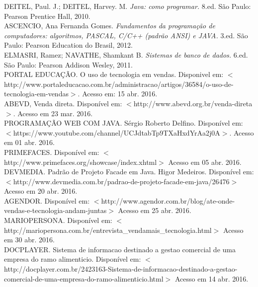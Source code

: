 \documentclass[chapter=TITLE,12pt,oneside,a4paper,english,french,sumario=tradicional,spanish,brazil,]{abntex2}
\begin{document}
\begin{thebibliography}{99}
DEITEL, Paul. J.; DEITEL, Harvey. M. {\em Java: como programar.} 8.ed. São Paulo: Pearson Prentice Hall, 2010.
\\[0,4cm]

ASCENCIO, Ana Fernanda Gomes. {\em Fundamentos da programação de computadores: algoritmos,
PASCAL, C/C++ (padrão ANSI) e JAVA.} 3.ed. São Paulo: Pearson Education do Brasil, 2012.
\\[0,4cm]

ELMASRI, Ramez; NAVATHE, Shamkant B. {\em Sistemas de banco de dados.} 6.ed. São Paulo: Pearson Addison Wesley, 2011.
\\[0,4cm]

PORTAL EDUCAÇÃO. {O uso de tecnologia em vendas}. Disponivel em: $<$http://www.portaleducacao.com.br/administracao/artigos/36584/o-uso-de-tecnologia-em-vendas$>$. Acesso em: 15 abr. 2016.
\\[0,4cm]

ABEVD, Venda direta. Disponível em: $<$http://www.abevd.org.br/venda-direta$>$. Acesso em  23 mar. 2016.
\\[0,4cm]

PROGRAMAÇÃO WEB COM JAVA. Sérgio Roberto Delfino. Disponível em: $<$https://www.youtube.com/channel/UCJdtabTp9TXaHxdYrAa2j0A$>$. Acesso em  01 abr. 2016.
\\[0,4cm]

PRIMEFACES. Disponível em: $<$http://www.primefaces.org/showcase/index.xhtml$>$ Acesso em  05 abr. 2016.
\\[0,4cm]

DEVMEDIA. Padrão de Projeto Facade em Java. Higor Medeiros. Disponível em: $<$http://www.devmedia.com.br/padrao-de-projeto-facade-em-java/26476$>$ Acesso em  20 abr. 2016.
\\[0,4cm]

AGENDOR. Disponível em: $<$http://www.agendor.com.br/blog/ate-onde-vendas-e-tecnologia-andam-juntas$>$ Acesso em  25 abr. 2016.
\\[0,4cm]

MARIOPERSONA. Disponível em: $<$http://mariopersona.com.br/entrevista\_vendamais\_tecnologia.html$>$ Acesso em  30 abr. 2016.
\\[0,4cm]

DOCPLAYER. Sistema de informacao destinado a gestao comercial de uma empresa do ramo alimenticio. Disponível em: $<$http://docplayer.com.br/2423163-Sistema-de-informacao-destinado-a-gestao-comercial-de-uma-empresa-do-ramo-alimenticio.html$>$ Acesso em  14 abr. 2016.
\\[0,4cm]

\end{thebibliography}
\end{document}
